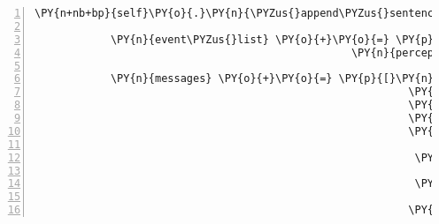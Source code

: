 \begin{Verbatim}[commandchars=\\\{\},numbers=left,firstnumber=1,stepnumber=1]
            \PY{n+nb+bp}{self}\PY{o}{.}\PY{n}{\PYZus{}append\PYZus{}sentence}\PY{p}{(}\PY{n}{ID\PYZus{}KUNI}\PY{p}{,} \PY{l+s}{\PYZsq{}}\PY{l+s}{Die Tür zum Gnomenweg ist offen! Da gehts zum Zauberwald lang!}\PY{l+s}{\PYZsq{}}\PY{p}{)}

            \PY{n}{event\PYZus{}list} \PY{o}{+}\PY{o}{=} \PY{p}{[}\PY{n}{fabula}\PY{o}{.}\PY{n}{PerceptionEvent}\PY{p}{(}\PY{n}{identifier}\PY{o}{=}\PY{n}{ID\PYZus{}KUNI}\PY{p}{,}
                                                  \PY{n}{perception}\PY{o}{=}\PY{l+s}{\PYZsq{}}\PY{l+s}{Der Eingang zum Gnomenweg ist offen.}\PY{l+s}{\PYZsq{}}\PY{p}{)}\PY{p}{]}

            \PY{n}{messages} \PY{o}{+}\PY{o}{=} \PY{p}{[}\PY{n}{fabula}\PY{o}{.}\PY{n}{Message}\PY{p}{(}\PY{p}{[}\PY{n}{fabula}\PY{o}{.}\PY{n}{SpawnEvent}\PY{p}{(}\PY{n}{fabula}\PY{o}{.}\PY{n}{Entity}\PY{p}{(}\PY{l+s}{\PYZsq{}}\PY{l+s}{door\PYZus{}unlocked}\PY{l+s}{\PYZsq{}}\PY{p}{,}
                                                           \PY{n}{fabula}\PY{o}{.}\PY{n}{ITEM}\PY{p}{,}
                                                           \PY{n+nb+bp}{False}\PY{p}{,}
                                                           \PY{n+nb+bp}{False}\PY{p}{,}
                                                           \PY{p}{\PYZob{}}\PY{l+s}{\PYZsq{}}\PY{l+s}{image/png}\PY{l+s}{\PYZsq{}}\PY{p}{:} \PY{n}{fabula}\PY{o}{.}\PY{n}{Asset}\PY{p}{(}\PY{n}{uri}\PY{o}{=}\PY{l+s}{\PYZsq{}}\PY{l+s}{1x1\PYZhy{}empty.png}\PY{l+s}{\PYZsq{}}\PY{p}{,}
                                                                                      \PY{n}{data}\PY{o}{=}\PY{n+nb+bp}{None}\PY{p}{)}\PY{p}{,}
                                                            \PY{l+s}{\PYZsq{}}\PY{l+s}{audio/ogg}\PY{l+s}{\PYZsq{}}\PY{p}{:} \PY{n}{fabula}\PY{o}{.}\PY{n}{Asset}\PY{p}{(}\PY{n}{uri}\PY{o}{=}\PY{l+s}{\PYZsq{}}\PY{l+s}{door\PYZus{}unlocked.ogg}\PY{l+s}{\PYZsq{}}\PY{p}{,}
                                                                                      \PY{n}{data}\PY{o}{=}\PY{n+nb+bp}{None}\PY{p}{)}\PY{p}{,}
                                                            \PY{l+s}{\PYZsq{}}\PY{l+s}{text/plain}\PY{l+s}{\PYZsq{}}\PY{p}{:} \PY{n}{fabula}\PY{o}{.}\PY{n}{Asset}\PY{p}{(}\PY{n}{uri}\PY{o}{=}\PY{l+s}{\PYZsq{}}\PY{l+s}{door\PYZus{}unlocked.txt}\PY{l+s}{\PYZsq{}}\PY{p}{,}
                                                                                       \PY{n}{data}\PY{o}{=}\PY{n+nb+bp}{None}\PY{p}{)}\PY{p}{\PYZcb{}}\PY{p}{)}\PY{p}{,}
                                                           \PY{n}{room}\PY{o}{.}\PY{n}{entity\PYZus{}locations}\PY{p}{[}\PY{l+s}{\PYZsq{}}\PY{l+s}{door}\PY{l+s}{\PYZsq{}}\PY{p}{]} \PY{o}{+} \PY{p}{(}\PY{n}{room}\PY{o}{.}\PY{n}{identifier}\PY{p}{,}\PY{p}{)}\PY{p}{)}\PY{p}{]}\PY{p}{)}\PY{p}{,}

\end{Verbatim}
